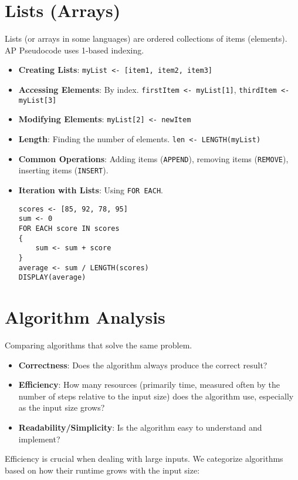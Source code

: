 \documentclass[11pt,oneside]{book}
\begin{document}
\section{Lists (Arrays)}
\label{sec:lists}
Lists (or arrays in some languages) are ordered collections of items (elements). AP Pseudocode uses 1-based indexing.
\begin{itemize}
    \item \textbf{Creating Lists}: \texttt{myList <- [item1, item2, item3]}
    \item \textbf{Accessing Elements}: By index. \texttt{firstItem <- myList[1]}, \texttt{thirdItem <- myList[3]}
    \item \textbf{Modifying Elements}: \texttt{myList[2] <- newItem}
    \item \textbf{Length}: Finding the number of elements. \texttt{len <- LENGTH(myList)}
    \item \textbf{Common Operations}: Adding items (\texttt{APPEND}), removing items (\texttt{REMOVE}), inserting items (\texttt{INSERT}).
    \item \textbf{Iteration with Lists}: Using \texttt{FOR EACH}.
    \begin{lstlisting}[language=APCSP, label={lst:list_iteration}, caption={AP Pseudocode: List Iteration}]
scores <- [85, 92, 78, 95]
sum <- 0
FOR EACH score IN scores
{
    sum <- sum + score
}
average <- sum / LENGTH(scores)
DISPLAY(average)
\end{lstlisting}
\end{itemize}

\section{Algorithm Analysis}
\label{sec:algorithm_analysis}
Comparing algorithms that solve the same problem.
\begin{itemize}
    \item \textbf{Correctness}: Does the algorithm always produce the correct result?
    \item \textbf{Efficiency}: How many resources (primarily time, measured often by the number of steps relative to the input size) does the algorithm use, especially as the input size grows?
    \item \textbf{Readability/Simplicity}: Is the algorithm easy to understand and implement?
\end{itemize}

Efficiency is crucial when dealing with large inputs. We categorize algorithms based on how their runtime grows with the input size:
\end{document}
